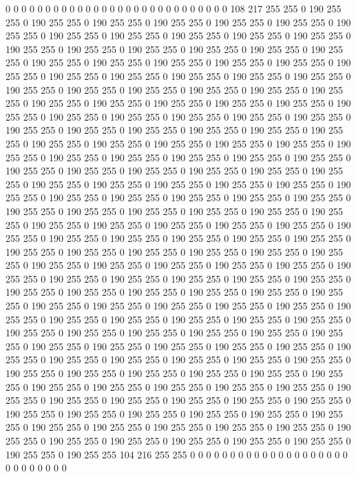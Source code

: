 0 0 0 0 0 0 0 0 0 0 0 0 0 0 0 0 0 0 0 0 0 0 0 0 0 0 0 0 108 217 255 255 0 190 255 255 0 190 255 255 0 190 255 255 0 190 255 255 0 190 255 255 0 190 255 255 0 190 255 255 0 190 255 255 0 190 255 255 0 190 255 255 0 190 255 255 0 190 255 255 0 190 255 255 0 190 255 255 0 190 255 255 0 190 255 255 0 190 255 255 0 190 255 255 0 190 255 255 0 190 255 255 0 190 255 255 0 190 255 255 0 190 255 255 0 190 255 255 0 190 255 255 0 190 255 255 0 190 255 255 0 190 255 255 0 190 255 255 0 190 255 255 0 190 255 255 0 190 255 255 0 190 255 255 0 190 255 255 0 190 255 255 0 190 255 255 0 190 255 255 0 190 255 255 0 190 255 255 0 190 255 255 0 190 255 255 0 190 255 255 
0 190 255 255 0 190 255 255 0 190 255 255 0 190 255 255 0 190 255 255 0 190 255 255 0 190 255 255 0 190 255 255 0 190 255 255 0 190 255 255 0 190 255 255 0 190 255 255 0 190 255 255 0 190 255 255 0 190 255 255 0 190 255 255 0 190 255 255 0 190 255 255 0 190 255 255 0 190 255 255 0 190 255 255 0 190 255 255 0 190 255 255 0 190 255 255 0 190 255 255 0 190 255 255 0 190 255 255 0 190 255 255 0 190 255 255 0 190 255 255 0 190 255 255 0 190 255 255 0 190 255 255 0 190 255 255 0 190 255 255 0 190 255 255 0 190 255 255 0 190 255 255 0 190 255 255 0 190 255 255 0 190 255 255 0 190 255 255 0 190 255 255 0 190 255 255 0 190 255 255 0 190 255 255 0 190 255 255 0 190 255 255 0 190 255 255 0 190 255 255 
0 190 255 255 0 190 255 255 0 190 255 255 0 190 255 255 0 190 255 255 0 190 255 255 0 190 255 255 0 190 255 255 0 190 255 255 0 190 255 255 0 190 255 255 0 190 255 255 0 190 255 255 0 190 255 255 0 190 255 255 0 190 255 255 0 190 255 255 0 190 255 255 0 190 255 255 0 190 255 255 0 190 255 255 0 190 255 255 0 190 255 255 0 190 255 255 0 190 255 255 0 190 255 255 0 190 255 255 0 190 255 255 0 190 255 255 0 190 255 255 0 190 255 255 0 190 255 255 0 190 255 255 0 190 255 255 0 190 255 255 0 190 255 255 0 190 255 255 0 190 255 255 0 190 255 255 0 190 255 255 0 190 255 255 0 190 255 255 0 190 255 255 0 190 255 255 0 190 255 255 0 190 255 255 0 190 255 255 0 190 255 255 0 190 255 255 0 190 255 255 
0 190 255 255 0 190 255 255 0 190 255 255 0 190 255 255 0 190 255 255 0 190 255 255 0 190 255 255 0 190 255 255 0 190 255 255 0 190 255 255 0 190 255 255 0 190 255 255 0 190 255 255 0 190 255 255 0 190 255 255 0 190 255 255 0 190 255 255 0 190 255 255 0 190 255 255 0 190 255 255 0 190 255 255 0 190 255 255 0 190 255 255 0 190 255 255 0 190 255 255 0 190 255 255 0 190 255 255 0 190 255 255 0 190 255 255 0 190 255 255 0 190 255 255 0 190 255 255 0 190 255 255 0 190 255 255 0 190 255 255 0 190 255 255 0 190 255 255 0 190 255 255 0 190 255 255 0 190 255 255 0 190 255 255 0 190 255 255 104 216 255 255 0 0 0 0 0 0 0 0 0 0 0 0 0 0 0 0 0 0 0 0 0 0 0 0 0 0 0 0 
